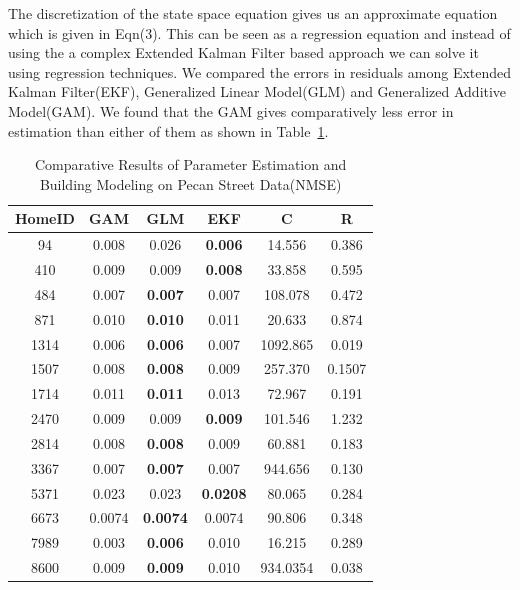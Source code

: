\documentclass{sig-alternate}
\begin{document}
 \indent The discretization of the state space equation gives us an approximate equation which is given in Eqn(3). This can be seen as a regression equation and instead of using the a complex Extended Kalman Filter based approach we can solve it using regression techniques. We compared the errors in residuals among Extended Kalman Filter(EKF), Generalized Linear Model(GLM) and Generalized Additive Model(GAM). We found that the GAM gives comparatively less error in estimation than either of them as shown in Table~\ref{Table:Par1}.
 
 \begin{table}
 \begin{tabular}{||c| c | c | c | c | c ||} 
 \hline 
 HomeID &  GAM & GLM & EKF & C & R  \\ [0.5ex] 
  \hline \hline
94 & 0.008  & 0.026  & \textbf{0.006 } &  14.556 &
 0.386 \\ \hline 
410 &  0.009 & 0.009  & \textbf{0.008} &  33.858 &
 0.595 \\ \hline
484 & 0.007 & \textbf{0.007} & 0.007 &  108.078 &
 0.472\\ \hline
871 & 0.010  & \textbf{0.010 } &  0.011 & 20.633 &
0.874\\ \hline
1314 & 0.006   & \textbf{0.006 } & 0.007 & 1092.865 &
0.019\\ \hline
1507 & 0.008  & \textbf{0.008 } & 0.009 & 257.370
& 0.1507 \\ \hline
1714 &  0.011  & \textbf{ 0.011 } & 0.013 &  72.967 & 
 0.191\\ \hline 
2470 & 0.009  & 0.009  &  \textbf{0.009} & 101.546&
1.232\\ \hline 
2814 & 0.008 & \textbf{0.008} & 0.009&  60.881&
 0.183\\ \hline
3367 & 0.007 & \textbf{0.007} & 0.007 & 944.656
& 0.130\\ \hline
5371 & 0.023 & 0.023 & \textbf{0.0208} &  80.065 & 
 0.284\\ \hline
6673 & 0.0074 & \textbf{0.0074} &  0.0074 &90.806
&0.348\\ \hline
7989 & 0.003 & \textbf{0.006} & 0.010 &16.215
&0.289\\ \hline
8600 & 0.009 & \textbf{0.009} & 0.010 &934.0354
&0.038\\ \hline
 \hline
\end{tabular}
 \label{Table:Par1}

\caption{Comparative Results of Parameter Estimation and Building Modeling on Pecan Street Data(NMSE)}
\end{table}
  
\end{document}
